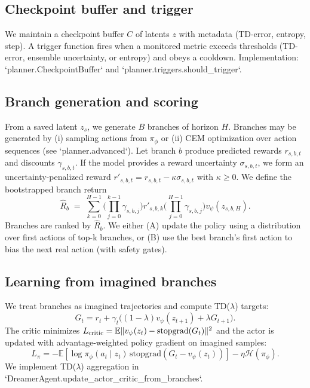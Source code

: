 \documentclass{article}
\begin{document}
\subsection{Checkpoint buffer and trigger}
We maintain a checkpoint buffer \(C\) of latents \(z\) with metadata (TD-error,
entropy, step). A trigger function fires when a monitored metric exceeds
thresholds (TD-error, ensemble uncertainty, or entropy) and obeys a cooldown.
Implementation: `planner.CheckpointBuffer` and `planner.triggers.should_trigger`.

\subsection{Branch generation and scoring}
From a saved latent \(z_s\), we generate \(B\) branches of horizon \(H\).
Branches may be generated by (i) sampling actions from \(\pi_\phi\) or
(ii) CEM optimization over action sequences (see `planner.advanced`).
Let branch \(b\) produce predicted rewards \(r_{s,b,t}\) and discounts \(\gamma_{s,b,t}\).
If the model provides a reward uncertainty \(\sigma_{s,b,t}\), we form
an uncertainty-penalized reward \(r'_{s,b,t}=r_{s,b,t}-\kappa\sigma_{s,b,t}\)
with \(\kappa\ge0\).
We define the bootstrapped branch return
\begin{equation}
\hat R_b \;=\; \sum_{k=0}^{H-1}\Big(\prod_{j=0}^{k-1}\gamma_{s,b,j}\Big) r'_{s,b,k}
 \Big(\prod_{j=0}^{H-1}\gamma_{s,b,j}\Big) v_\psi(z_{s,b,H}).
\label{eq:branch-return}
\end{equation}
Branches are ranked by \(\hat R_b\). We either (A) update the policy using a
distribution over first actions of top-k branches, or (B) use the best branch's
first action to bias the next real action (with safety gates).

\subsection{Learning from imagined branches}
We treat branches as imagined trajectories and compute TD(\(\lambda\)) targets:
\begin{equation}
G_t = r_t + \gamma_t\big((1-\lambda)v_\psi(z_{t+1}) + \lambda G_{t+1}\big).
\label{eq:td-lambda}
\end{equation}
The critic minimizes \(L_{\rm critic}=\mathbb{E}\|v_\psi(z_t)-\mathrm{stopgrad}(G_t)\|^2\)
and the actor is updated with advantage-weighted policy gradient on imagined samples:
\[
L_\pi = -\mathbb{E}[\log\pi_\phi(a_t\mid z_t)\,\mathrm{stopgrad}(G_t-v_\psi(z_t))] - \eta\mathcal{H}(\pi_\phi).
\]
We implement TD(\(\lambda\)) aggregation in `DreamerAgent.update_actor_critic_from_branches`.
\end{document}
